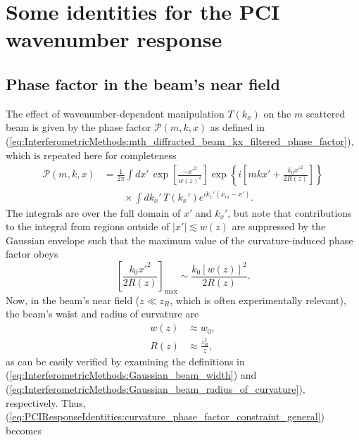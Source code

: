 \chapter{Some identities for the PCI wavenumber response}
\label{app:PCIResponseIdentities}


\section{Phase factor in the beam's near field}
The effect of wavenumber-dependent manipulation $T(k_x)$
on the $m$ scattered beam is given by
the phase factor $\mathcal{P}(m, k, x)$ as defined in
(\ref{eq:InterferometricMethods:mth_diffracted_beam_kx_filtered_phase_factor}),
which is repeated here for completeness
\begin{equation}
  \begin{aligned}
    \mathcal{P}(m, k, x)
    &=
    \frac{1}{2 \pi}
    \int dx' \,
    \exp\left[ \frac{-x'^2}{w(z)^2} \right]
    \exp\left\{%
      i \left[%
        m k x'
        +
        \frac{k_0 x'^2}{2 R(z)}
      \right]
    \right\}
    \\
    &\qquad \times
    \int dk_x' \,
    T(k_x')
    e^{i k_x' (x_m - x')}.
  \end{aligned}
  \label{eq:PCIResponseIdentities:mth_diffracted_beam_kx_filtered_phase_factor_full}
\end{equation}
The integrals are over the full domain of $x'$ and $k_x'$, but
note that contributions to the integral
from regions outside of $|x'| \lesssim w(z)$
are suppressed by the Gaussian envelope such that
the maximum value of the curvature-induced phase factor obeys
\begin{equation}
  \left[ \frac{k_0 x'^2}{2 R(z)} \right]_{\text{max}}
  \sim
  \frac{k_0 [w(z)]^2}{2 R(z)}.
  \label{eq:PCIResponseIdentities:curvature_phase_factor_constraint_general}
\end{equation}
Now, in the beam's near field
($z \ll z_R$, which is often experimentally relevant),
the beam's waist and radius of curvature are
\begin{align}
  w(z) &\approx w_0,
  \\
  R(z) &\approx \frac{z_R^2}{z},
\end{align}
as can be easily verified by examining the definitions in
(\ref{eq:InterferometricMethods:Gaussian_beam_width}) and
(\ref{eq:InterferometricMethods:Gaussian_beam_radius_of_curvature}),
respectively.
Thus,
(\ref{eq:PCIResponseIdentities:curvature_phase_factor_constraint_general})
becomes
